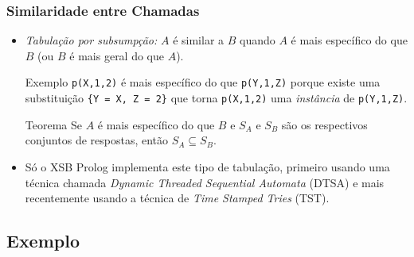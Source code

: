 \documentclass{beamer}
\begin{document}
\begin{frame}
   \frametitle{Similaridade entre Chamadas}
   \begin{itemize}
   \item \emph{Tabulação por subsumpção:} $A$ é similar a $B$ quando $A$ é mais específico do que $B$ (ou $B$ é mais geral do que $A$).
   \begin{block}{Exemplo}
      \texttt{p(X,1,2)} é mais específico do que \texttt{p(Y,1,Z)} porque existe uma substituição \texttt{\{Y~=~X,~Z~=~2\}}
      que torna \texttt{p(X,1,2)} uma \emph{instância} de \texttt{p(Y,1,Z)}.
   \end{block}
   \pause
   \begin{block}{Teorema}
      Se $A$ é mais específico do que $B$ e $S_A$ e $S_B$ são os respectivos conjuntos de respostas, então $S_A \subseteq S_B$.
   \end{block}
   \pause
   \item Só o XSB Prolog implementa este tipo de tabulação, primeiro usando uma técnica chamada \textit{Dynamic Threaded Sequential Automata} (DTSA) e mais recentemente usando a técnica de \textit{Time Stamped Tries} (TST).
\end{itemize}
\end{frame}

\subsection{Exemplo}
\end{document}
